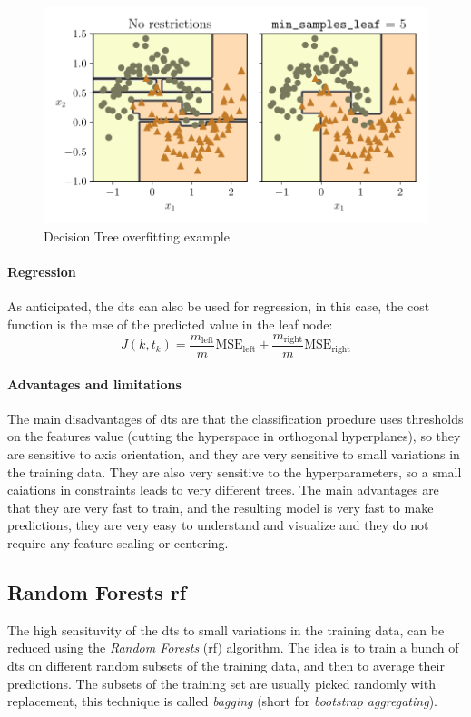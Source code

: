 \begin{figure}
    \centering
    \includegraphics{images/MachineLearning/DecisionTreeOverfitting.pdf}
    \caption{Decision Tree overfitting example }
    \label{fig:DecisionTreeOverfitting}
\end{figure}

\paragraph{Regression}
As anticipated, the \gls{dt}s can also be used for regression, in this case, the cost function is the \gls{mse} of the predicted value in the leaf node:
\begin{equation}
    J(k, t_k) = \frac{m_{\text{left}}}{m}\text{MSE}_{\text{left}} + \frac{m_{\text{right}}}{m}\text{MSE}_{\text{right}}
\end{equation}

\paragraph{Advantages and limitations}
The main disadvantages of \gls{dt}s are that the classification proedure uses thresholds on the features value (cutting the hyperspace in orthogonal hyperplanes), so they are sensitive to axis orientation, and they are very sensitive to small variations in the training data. They are also very sensitive to the hyperparameters, so a small caiations in constraints leads to very different trees. The main advantages are that they are very fast to train, and the resulting model is very fast to make predictions, they are very easy to understand and visualize and they do not require any feature scaling or centering.

\subsection{Random Forests \gls{rf}}
\label{subsec:rf}
The high sensituvity of the \gls{dt}s to small variations in the training data, can be reduced using the \emph{Random Forests} (\gls{rf}) algorithm. The idea is to train a bunch of \gls{dt}s on different random subsets of the training data, and then to average their predictions. The subsets of the training set are usually picked randomly with replacement, this technique is called \emph{bagging} (short for \emph{bootstrap aggregating}). 

